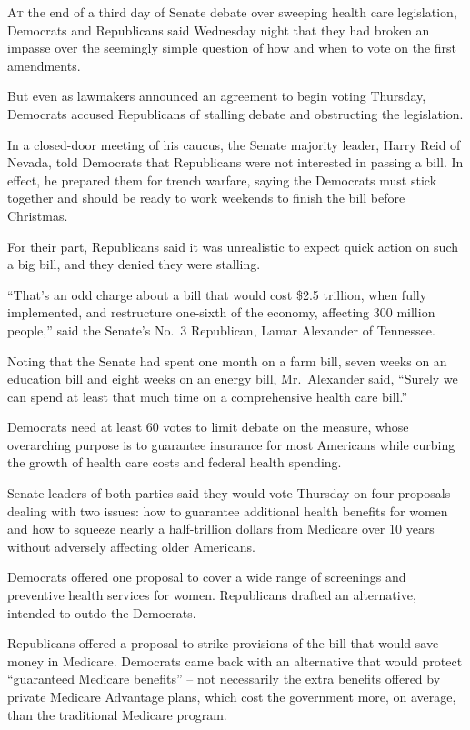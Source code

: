 ﻿\documentclass[12pt]{article}
\begin{document}
\lettrine{A}{t} the end of a third day of Senate debate over sweeping health
care legislation, Democrats and Republicans said Wednesday night that they had broken an impasse
over the seemingly simple question of how and when to vote on the first amendments.

But even as lawmakers announced an agreement to begin voting Thursday, Democrats accused Republicans
of stalling debate and obstructing the legislation.

In a closed-door meeting of his caucus, the Senate majority leader, Harry Reid of Nevada, told
Democrats that Republicans were not interested in passing a bill. In effect, he prepared them for
trench warfare, saying the Democrats must stick together and should be ready to work weekends to
finish the bill before Christmas.

For their part, Republicans said it was unrealistic to expect quick action on such a big bill, and
they denied they were stalling.

``That's an odd charge about a bill that would cost \$2.5 trillion, when fully implemented, and
restructure one-sixth of the economy, affecting 300 million people,'' said the Senate's No.~3
Republican, Lamar Alexander of Tennessee.

Noting that the Senate had spent one month on a farm bill, seven weeks on an education bill and
eight weeks on an energy bill, Mr.~Alexander said, ``Surely we can spend at least that much time on
a comprehensive health care bill.''

Democrats need at least 60 votes to limit debate on the measure, whose overarching purpose is to
guarantee insurance for most Americans while curbing the growth of health care costs and federal
health spending.

Senate leaders of both parties said they would vote Thursday on four proposals dealing with two
issues: how to guarantee additional health benefits for women and how to squeeze nearly a
half-trillion dollars from Medicare over 10 years without adversely affecting older Americans.

Democrats offered one proposal to cover a wide range of screenings and preventive health services
for women. Republicans drafted an alternative, intended to outdo the Democrats.

Republicans offered a proposal to strike provisions of the bill that would save money in Medicare.
Democrats came back with an alternative that would protect ``guaranteed Medicare benefits'' -- not
necessarily the extra benefits offered by private Medicare Advantage plans, which cost the
government more, on average, than the traditional Medicare program.
\end{document}
